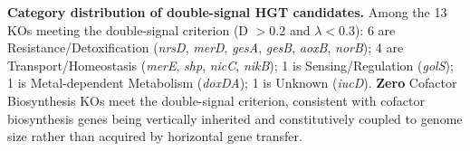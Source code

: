\documentclass[11pt]{article}
\begin{document}
\noindent\textbf{Category distribution of double-signal HGT candidates.}
Among the 13 KOs meeting the double-signal criterion (D $> 0.2$ and $\lambda <
0.3$): 6 are Resistance/Detoxification (\textit{nrsD}, \textit{merD},
\textit{gesA}, \textit{gesB}, \textit{aoxB}, \textit{norB}); 4 are
Transport/Homeostasis (\textit{merE}, \textit{shp}, \textit{nicC},
\textit{nikB}); 1 is Sensing/Regulation (\textit{golS}); 1 is
Metal-dependent Metabolism (\textit{doxDA}); 1 is Unknown (\textit{iucD}).
\textbf{Zero} Cofactor Biosynthesis KOs meet the double-signal criterion,
consistent with cofactor biosynthesis genes being vertically inherited and
constitutively coupled to genome size rather than acquired by horizontal gene
transfer.

\end{document}
